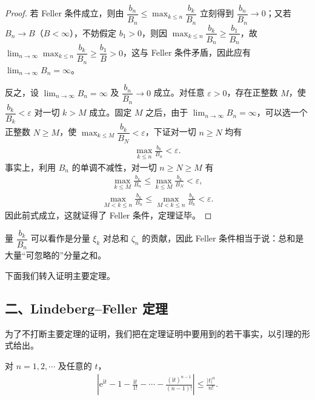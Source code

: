 \documentclass[../../main.tex]{subfiles}
\begin{document}
\begin{proof}
若 Feller 条件成立，则由 $\dfrac{b_n}{B_n}\leqslant\max_{k\leqslant n}\dfrac{b_k}{B_n}$ 立刻得到 $\dfrac{b_n}{B_n}\to0$；又若 $B_n\to B$（$B<\infty$），不妨假定 $b_1>0$，则因 $\max_{k\leqslant n}\dfrac{b_k}{B_n}\geqslant\dfrac{b_1}{B_n}$，故 $\lim_{n\to\infty}\max_{k\leqslant n}\dfrac{b_k}{B_n}\geqslant\dfrac{b_1}{B}>0$，这与 Feller 条件矛盾，因此应有 $\lim_{n\to\infty}B_n=\infty$。

反之，设 $\lim_{n\to\infty}B_n=\infty$ 及 $\dfrac{b_n}{B_n}\to0$ 成立。对任意 $\varepsilon>0$，存在正整数 $M$，使 $\dfrac{b_k}{B_k}<\varepsilon$ 对一切 $k>M$ 成立。固定 $M$ 之后，由于 $\lim_{n\to\infty}B_n=\infty$，可以选一个正整数 $N\geqslant M$，使 $\max_{k\leqslant M}\dfrac{b_k}{B_N}<\varepsilon$，下证对一切 $n\geqslant N$ 均有
\begin{align}
\max_{k\leqslant n}\frac{b_k}{B_n}<\varepsilon.
\end{align}
事实上，利用 $B_n$ 的单调不减性，对一切 $n\geqslant N\geqslant M$ 有
\begin{align*}
\max_{k\leqslant M}\frac{b_k}{B_n}\leqslant\max_{k\leqslant M}\frac{b_k}{B_N}<\varepsilon,
\end{align*}
\begin{align*}
\max_{M<k\leqslant n}\frac{b_k}{B_n}\leqslant\max_{M<k\leqslant n}\frac{b_k}{B_k}<\varepsilon.
\end{align*}
因此前式成立，这就证得了 Feller 条件，定理证毕。
\end{proof}

量 $\dfrac{b_k}{B_n}$ 可以看作是分量 $\xi_k$ 对总和 $\zeta_n$ 的贡献，因此 Feller 条件相当于说：总和是大量``可忽略的''分量之和。

下面我们转入证明主要定理。

\subsection*{二、Lindeberg--Feller 定理}

为了不打断主要定理的证明，我们把在定理证明中要用到的若干事实，以引理的形式给出。

\begin{lemma}\label{lemma:ch05-指数展开估计}
对 $n=1,2,\cdots$ 及任意的 $t$，
\begin{align}
\left|\mathrm{e}^{\mathrm{i}t}-1-\frac{\mathrm{i}t}{1!}-\cdots-\frac{(\mathrm{i}t)^{n-1}}{(n-1)!}\right|\leqslant\frac{|t|^{n}}{n!}.
\end{align}
\end{lemma}
\end{document}
